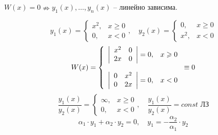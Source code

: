 \begin{remark}
    $W(x) = 0 \nRightarrow y_1(x),\ldots,y_n(x)$ -- линейно зависима.

    \[
        y_1(x) = \left\{\begin{array}{ll}
            x^2, & x \geqslant 0 \\
            0,   & x < 0
        \end{array}\right., \quad y_2(x) = \left\{\begin{array}{ll}
            0,   & x \geqslant 0 \\
            x^2, & x < 0
        \end{array}\right.
    \]
    \[
        W(x) = \left\{\begin{array}{ll}
            \left|\begin{array}{cc}
                      x^2 & 0 \\
                      2x  & 0
                  \end{array}\right| = 0, & x \geqslant 0 \\
            \empty                                        \\
            \left|\begin{array}{cc}
                      0 & x^2 \\
                      0 & 2x
                  \end{array}\right| = 0, & x < 0
        \end{array}\right. \equiv 0
    \]
    \[
        \frac{y_1(x)}{y_2(x)} = \left\{\begin{array}{ll}
            \infty, & x \geqslant 0 \\
            0,      & x < 0
        \end{array}\right., \quad \frac{y_1(x)}{y_2(x)} = const\text{ ЛЗ}
    \]
    \[
        \alpha_1\cdot y_1 + \alpha_2 \cdot y_2 = 0, \quad y_1 = - \frac{\alpha_2}{\alpha_1} \cdot y_2
    \]
\end{remark}